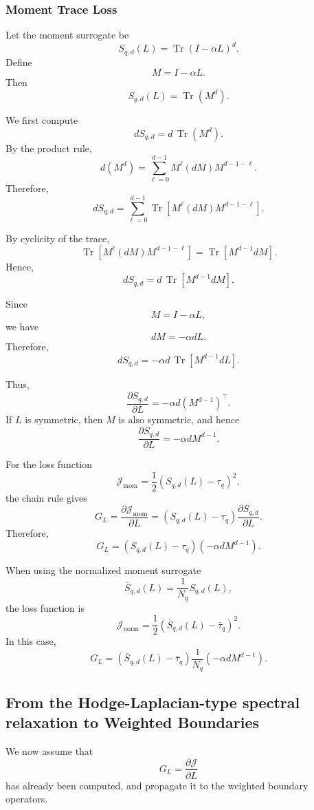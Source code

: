 \documentclass[pdflatex,sn-mathphys-ay]{sn-jnl}%
\theoremstyle{thmstyleone}%
\theoremstyle{thmstyletwo}%
\theoremstyle{thmstylethree}%
\begin{document}
\begin{appendices}
\subsubsection{Moment Trace Loss}

Let the moment surrogate be
\[
S_{q,d}(L)
=
\operatorname{Tr}
\left(
I-\alpha L
\right)^d.
\]
Define
\[
M
=
I-\alpha L.
\]
Then
\[
S_{q,d}(L)
=
\operatorname{Tr}(M^d).
\]

We first compute
\[
dS_{q,d}
=
d\,\operatorname{Tr}(M^d).
\]
By the product rule,
\[
d(M^d)
=
\sum_{\ell=0}^{d-1}
M^\ell(dM)M^{d-1-\ell}.
\]
Therefore,
\[
dS_{q,d}
=
\sum_{\ell=0}^{d-1}
\operatorname{Tr}
\left[
M^\ell(dM)M^{d-1-\ell}
\right].
\]

By cyclicity of the trace,
\[
\operatorname{Tr}
\left[
M^\ell(dM)M^{d-1-\ell}
\right]
=
\operatorname{Tr}
\left[
M^{d-1}dM
\right].
\]
Hence,
\[
dS_{q,d}
=
d\,
\operatorname{Tr}
\left[
M^{d-1}dM
\right].
\]

Since
\[
M=I-\alpha L,
\]
we have
\[
dM=-\alpha dL.
\]
Therefore,
\[
dS_{q,d}
=
-\alpha d\,
\operatorname{Tr}
\left[
M^{d-1}dL
\right].
\]

Thus,
\[
\frac{\partial S_{q,d}}{\partial L}
=
-\alpha d
\left(
M^{d-1}
\right)^\top.
\]
If \(L\) is symmetric, then \(M\) is also symmetric, and hence
\[
\frac{\partial S_{q,d}}{\partial L}
=
-\alpha d
M^{d-1}.
\]

For the loss function
\[
\mathcal{J}_{\mathrm{mom}}
=
\frac{1}{2}
\left(
S_{q,d}(L)-\tau_q
\right)^2,
\]
the chain rule gives
\[
G_L
=
\frac{\partial\mathcal{J}_{\mathrm{mom}}}{\partial L}
=
\left(
S_{q,d}(L)-\tau_q
\right)
\frac{\partial S_{q,d}}{\partial L}.
\]
Therefore,
\[
G_L
=
\left(
S_{q,d}(L)-\tau_q
\right)
\left(
-\alpha d M^{d-1}
\right).
\]

When using the normalized moment surrogate
\[
\overline{S}_{q,d}(L)
=
\frac{1}{N_q}S_{q,d}(L),
\]
the loss function is
\[
\mathcal{J}_{\mathrm{norm}}
=
\frac{1}{2}
\left(
\overline{S}_{q,d}(L)-\bar{\tau}_q
\right)^2.
\]
In this case,
\[
G_L
=
\left(
\overline{S}_{q,d}(L)-\bar{\tau}_q
\right)
\frac{1}{N_q}
\left(
-\alpha d M^{d-1}
\right).
\]

\subsection{From the Hodge-Laplacian-type spectral relaxation to Weighted Boundaries}

We now assume that
\[
G_L
=
\frac{\partial\mathcal{J}}{\partial L}
\]
has already been computed, and propagate it to the weighted boundary operators.


\end{appendices}
\end{document}
